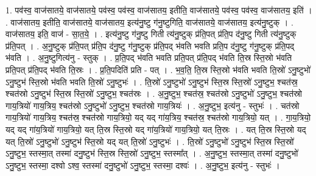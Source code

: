 \documentclass[17pt]{extarticle}
\begin{document}
1. पव॑स्व॒ वाज॑सातये॒ वाज॑सातये॒ पव॑स्व॒ पव॑स्व॒ वाज॑सातय॒ इतीति॒ वाज॑सातये॒ पव॑स्व॒ पव॑स्व॒ वाज॑सातय॒ इति॑ । . वाज॑सातय॒ इतीति॒ वाज॑सातये॒ वाज॑सातय॒ इत्य॑नु॒ष्टु ग॑नु॒ष्टुगिति॒ वाज॑सातये॒ वाज॑सातय॒ इत्य॑नु॒ष्टुक् । . वाज॑सातय॒ इति॒ वाज॑ - सा॒त॒ये॒ । . इत्य॑नु॒ष्टु ग॑नु॒ष्टु गिती त्य॑नु॒ष्टुक् प्र॑ति॒पत् प्र॑ति॒प द॑नु॒ष्टु गिती त्य॑नु॒ष्टुक् प्र॑ति॒पत् । . अ॒नु॒ष्टुक् प्र॑ति॒पत् प्र॑ति॒प द॑नु॒ष्टु ग॑नु॒ष्टुक् प्र॑ति॒पद् भ॑वति भवति प्रति॒प द॑नु॒ष्टु ग॑नु॒ष्टुक् प्र॑ति॒पद् भ॑वति । . अ॒नु॒ष्टुगित्य॑नु - स्तुक् । . प्र॒ति॒पद् भ॑वति भवति प्रति॒पत् प्र॑ति॒पद् भ॑वति ति॒स्र स्ति॒स्रो भ॑वति प्रति॒पत् प्र॑ति॒पद् भ॑वति ति॒स्रः । . प्र॒ति॒पदिति॑ प्रति - पत् । . भ॒व॒ति॒ ति॒स्र स्ति॒स्रो भ॑वति भवति ति॒स्रो॑ ऽनु॒ष्टुभो॑ ऽनु॒ष्टुभ॑ स्ति॒स्रो भ॑वति भवति ति॒स्रो॑ ऽनु॒ष्टुभः॑ । . ति॒स्रो॑ ऽनु॒ष्टुभो॑ ऽनु॒ष्टुभ॑ स्ति॒स्र स्ति॒स्रो॑ ऽनु॒ष्टुभ॒ श्चत॑स्र॒ श्चत॑स्रो ऽनु॒ष्टुभ॑ स्ति॒स्र स्ति॒स्रो॑ ऽनु॒ष्टुभ॒ श्चत॑स्रः । . अ॒नु॒ष्टुभ॒ श्चत॑स्र॒ श्चत॑स्रो ऽनु॒ष्टुभो॑ ऽनु॒ष्टुभ॒ श्चत॑स्रो गाय॒त्रियो॑ गाय॒त्रिय॒ श्चत॑स्रो ऽनु॒ष्टुभो॑ ऽनु॒ष्टुभ॒ श्चत॑स्रो गाय॒त्रियः॑ । . अ॒नु॒ष्टुभ॒ इत्य॑नु - स्तुभः॑ । . चत॑स्रो गाय॒त्रियो॑ गाय॒त्रिय॒ श्चत॑स्र॒ श्चत॑स्रो गाय॒त्रियो॒ यद् यद् गा॑य॒त्रिय॒ श्चत॑स्र॒ श्चत॑स्रो गाय॒त्रियो॒ यत् । . गा॒य॒त्रियो॒ यद् यद् गा॑य॒त्रियो॑ गाय॒त्रियो॒ यत् ति॒स्र स्ति॒स्रो यद् गा॑य॒त्रियो॑ गाय॒त्रियो॒ यत् ति॒स्रः । . यत् ति॒स्र स्ति॒स्रो यद् यत् ति॒स्रो॑ ऽनु॒ष्टुभो॑ ऽनु॒ष्टुभ॑ स्ति॒स्रो यद् यत् ति॒स्रो॑ ऽनु॒ष्टुभः॑ । . ति॒स्रो॑ ऽनु॒ष्टुभो॑ ऽनु॒ष्टुभ॑ स्ति॒स्र स्ति॒स्रो॑ ऽनु॒ष्टुभ॒ स्तस्मा॒त् तस्मा॑ दनु॒ष्टुभ॑ स्ति॒स्र स्ति॒स्रो॑ ऽनु॒ष्टुभ॒ स्तस्मा᳚त् । . अ॒नु॒ष्टुभ॒ स्तस्मा॒त् तस्मा॑ दनु॒ष्टुभो॑ ऽनु॒ष्टुभ॒ स्तस्मा॒ दश्वो ऽश्व॒ स्तस्मा॑ दनु॒ष्टुभो॑ ऽनु॒ष्टुभ॒ स्तस्मा॒ दश्वः॑ । . अ॒नु॒ष्टुभ॒ इत्य॑नु - स्तुभः॑ । \newline
\end{document}
